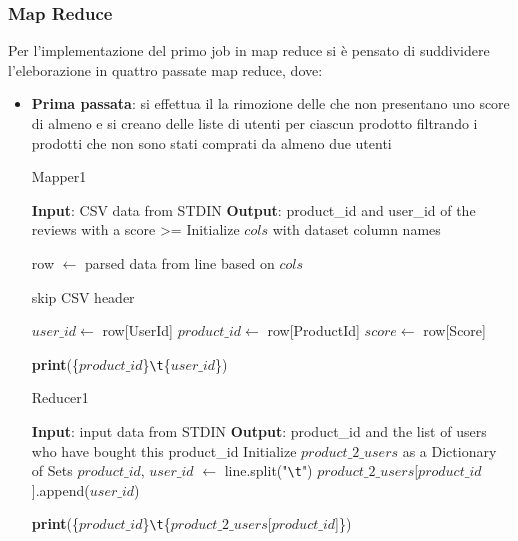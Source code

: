   \subsubsection{Map Reduce}
  Per l'implementazione del primo job in map reduce si è pensato di suddividere l'eleborazione in quattro passate map reduce, dove:
  \begin{itemize}
      \item \textbf{Prima passata}: si effettua il la rimozione delle  che non presentano uno score di almeno  e si creano delle liste di utenti per ciascun prodotto filtrando i prodotti che non sono stati comprati da almeno due utenti 

      \begin{algorithm}[!ht]
    \caption{Mapper1}
      \begin{algorithmic}[1]
        \STATE \textbf{Input}: CSV data from STDIN
        \STATE \textbf{Output}: product\_id and user\_id of the reviews with a score >=
        \STATE Initialize $cols$ with dataset column names
  
        \STATE row $\gets$ parsed data from line based on $cols$
        
        \STATE skip CSV header
    
        \STATE $user\_id \gets$ row[UserId]
        \STATE $product\_id \gets$ row[ProductId]
        \STATE $score \gets$ row[Score]

            \STATE \textbf{print}(\{$product\_id$\}\texttt{\textbackslash t}\{$user\_id$\}) 
        \ENDIF
       \ENDFOR
      \end{algorithmic}
    \end{algorithm}

    \begin{algorithm}[!ht]
      \caption{Reducer1}
      \begin{algorithmic}[1]
      \STATE \textbf{Input}: input data from STDIN
      \STATE \textbf{Output}: product\_id and the list of users who have bought this product\_id 
      \STATE Initialize $product\_2\_users$ as a Dictionary of Sets
        \STATE $product\_id$, $user\_id$ $\gets$ line.split("\texttt{\textbackslash t}")
        \STATE $product\_2\_users$[$product\_id$].append($user\_id$)
      \ENDFOR
      
        \STATE \textbf{print}(\{$product\_id$\}\texttt{\textbackslash t}\{$product\_2\_users$[$product\_id$]\})
        \ENDIF
      \ENDFOR
    \end{algorithmic}
    \end{algorithm}
    

\end{itemize}
